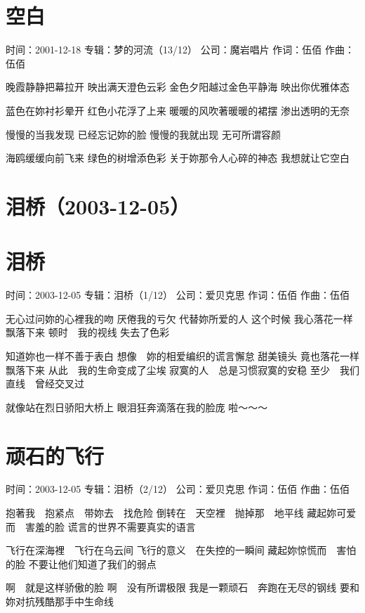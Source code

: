 \documentclass[UTF8,a4paper,oneside,twocolumn,12pt]{ctexbook}
\newcommand{\infopair}[2]{\textbullet #1：#2}
\newcommand{\zc}[1][伍佰]{\infopair{作词}{#1}}
\newcommand{\zq}[1][伍佰]{\infopair{作曲}{#1}}
\newcommand{\zj}[1]{\infopair{专辑}{#1}}
\newcommand{\sj}[1]{\infopair{时间}{#1}}
\newcommand{\gs}[1]{\infopair{公司}{#1}}
\newenvironment{info}{\begin{flushleft}\kaishu
	}
	{\end{flushleft}\normalsize\yahei\par}
\newenvironment{lyric}{
	}
{}
\begin{document}
\section{空白}
\begin{info}
	\sj{2001-12-18}
	\zj{梦的河流（13/12）}
	\gs{魔岩唱片}
	\zc
	\zq
\end{info}
\begin{lyric}
	晚霞静静把幕拉开
	映出满天澄色云彩
	金色夕阳越过金色平静海
	映出你优雅体态

	蓝色在妳衬衫晕开
	红色小花浮了上来
	暖暖的风吹著暖暖的裙摆
	渗出透明的无奈

	慢慢的当我发现
	已经忘记妳的脸
	慢慢的我就出现
	无可所谓容颜

	海鸥缓缓向前飞来
	绿色的树增添色彩
	关于妳那令人心碎的神态
	我想就让它空白
\end{lyric}

\section*{泪桥（2003-12-05）}
\section{泪桥}
\begin{info}
	\sj{2003-12-05}
	\zj{泪桥（1/12）}
	\gs{爱贝克思}
	\zc
	\zq
\end{info}
\begin{lyric}
	无心过问妳的心裡我的吻
	厌倦我的亏欠 代替妳所爱的人
	这个时候
	我心落花一样飘落下来
	顿时　我的视线
	失去了色彩

	知道妳也一样不善于表白
	想像　妳的相爱编织的谎言懈怠
	甜美镜头
	竟也落花一样飘落下来
	从此　我的生命变成了尘埃
	寂寞的人　总是习惯寂寞的安稳
	至少　我们直线　曾经交叉过

	就像站在烈日骄阳大桥上
	眼泪狂奔滴落在我的脸庞
	啦～～～
\end{lyric}

\section{顽石的飞行}
\begin{info}
	\sj{2003-12-05}
	\zj{泪桥（2/12）}
	\gs{爱贝克思}
	\zc
	\zq
\end{info}
\begin{lyric}
	抱著我　抱紧点　带妳去　找危险
	倒转在　天空裡　抛掉那　地平线
	藏起妳可爱而　害羞的脸
	谎言的世界不需要真实的语言

	飞行在深海裡　飞行在乌云间
	飞行的意义　在失控的一瞬间
	藏起妳惊慌而　害怕的脸
	不要让他们知道了我们的弱点

	啊　就是这样骄傲的脸
	啊　没有所谓极限
	我是一颗顽石　奔跑在无尽的钢线
	要和妳对抗残酷那手中生命线
\end{lyric}
\end{document}
